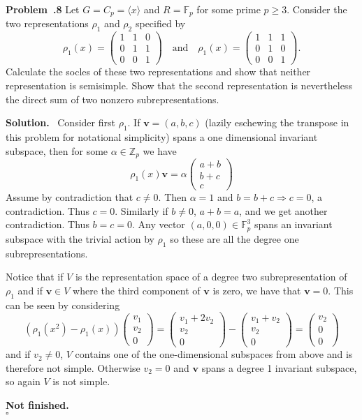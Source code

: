 \documentclass[12pt]{article}
\newcommand*{\Z}{
\mathbb{Z}
}
\newcommand*{\F}{
\mathbb{F}
}
\newenvironment{prob}[1]{\par\smallskip
	\noindent\begin{mdframed}\small \textbf{Problem~\thesection.#1} \rmfamily\quad}{\end{mdframed}\medskip}
\newenvironment{sol}{\noindent \textbf{Solution.} \,}{\\\hspace*{\fill}$\square$\medskip}
\begin{document}
\begin{prob}{8}
	Let $G=C_p=\langle x\rangle$ and $R=\F_p$ for some prime $p\ge 3.$ Consider the two representations $\rho_1$ and $\rho_2$ specified by
	\[\rho_1(x)=\begin{pmatrix}
		1&1&0\\0&1&1\\0&0&1
	\end{pmatrix}\quad\text{and}\quad \rho_1(x)=\begin{pmatrix}
	1&1&1\\0&1&0\\0&0&1
	\end{pmatrix}.\]
	Calculate the socles of these two representations and show that neither representation is semisimple. Show that the second representation is nevertheless the direct sum of two nonzero subrepresentations.
\end{prob}
\begin{sol}
	Consider first $\rho_1$. If $\mathbf{v}=(a,b,c)$ (lazily eschewing the transpose in this problem for notational simplicity) spans a one dimensional invariant subspace, then for some $\alpha\in\Z_p$ we have
	\[\rho_1(x)\mathbf{v}=\alpha\begin{pmatrix}
		a+b\\b+c\\c
	\end{pmatrix}\]
	Assume by contradiction that $c\ne 0$. Then $\alpha=1$ and $b=b+c\Rightarrow c=0$, a contradiction. Thus $c=0$. Similarly if $b\ne 0$, $a+b=a$, and we get another contradiction. Thus $b=c=0$. Any vector $(a,0,0)\in\F_p^3$ spans an invariant subspace with the trivial action by $\rho_1$ so these are all the degree one subrepresentations.
	
	Notice that if $V$ is the representation space of a degree two subrepresentation of $\rho_1$ and if $\mathbf{v}\in V$ where the third component of $\mathbf{v}$ is zero, we have that $\mathbf{v}=0$. This can be seen by considering 
	\[\left(\rho_1(x^2)-\rho_1(x)\right)\begin{pmatrix}v_1\\v_2\\0\end{pmatrix}=\begin{pmatrix}v_1+2v_2\\v_2\\0\end{pmatrix}-\begin{pmatrix}v_1+v_2\\v_2\\0\end{pmatrix}=\begin{pmatrix}v_2\\0\\0\end{pmatrix}\]
	and if $v_2\ne 0$, $V$ contains one of the one-dimensional subspaces from above and is therefore not simple. Otherwise $v_2=0$ and $\mathbf{v}$ spans a degree 1 invariant subspace, so again $V$ is not simple.
	
	\textbf{Not finished.}
\end{sol}
\end{document}
